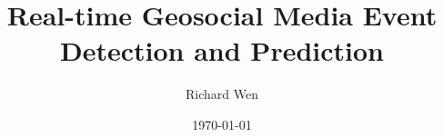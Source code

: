 



\title{Real-time Geosocial Media Event Detection and Prediction}
\author{Richard Wen}
\date{\footnotesize \today}

\maketitle

